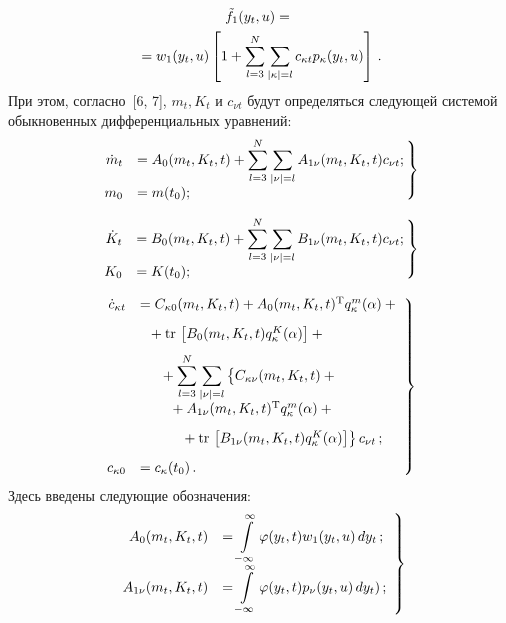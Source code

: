 \begin{multicols}{2}
\noindent
\begin{multline}
\tilde f_1 (y_t, u) ={}\\
{}= w_1 (y_t,u) \left[ 1+ \sum\limits_{l=3}^N \sum\limits_{\left\vert\kappa\right\vert=l} 
c_{\kappa t} p_\kappa (y_t,u)\right]\,.\label{e13s}
\end{multline}
При этом, согласно~[6, 7], $m_t, K_t$ и $c_{\nu t}$ будут определяться 
следующей системой обыкновенных дифференциальных уравнений:
\begin{equation}
\left.
\begin{array}{rl}
\!\!\!\!\!\dot m_t &= \displaystyle
A_0 (m_t, K_t, t) + \sss_{l=3}^N \sss_{\left\vert\nu\right\vert=l} 
A_{1\nu}(m_t, K_t, t)  c_{\nu t};\\[9pt] 
\!\!\!\!\!m_0 &= m(t_0);
\end{array}\!\!
\right\}\!\!\!\label{e14s}
\end{equation}

\noindent
\begin{equation}
\left.
\begin{array}{rl}
\!\!\!\!\!\dot K_t &= B_0 (m_t, K_t, t) +\displaystyle \sss_{l=3}^N \sss_{\left\vert\nu\right\vert=l} 
B_{1\nu}(m_t, K_t, t)  c_{\nu t};\\[9pt]
\!\!\!\!\!K_0 &= K(t_0);
\end{array}\!\!
\right\}\!\!\!
\label{e15s}
\end{equation}

\noindent
\begin{equation}
\left.
\begin{array}{rl}
\!\!\!\!\dot c_{\kappa t} &= C_{\kappa 0}  (m_t, K_t, t)+ A_0 (m_t, K_t, t)^{\mathrm{T}} 
q_\kappa^m (\alpha ) +{}\\[9pt]
&\hspace*{2mm}{}+
\mathrm{tr}\, \lk B_0 (m_t, K_t, t) q_\kappa^K (\alpha)\rk+{}\\[8pt]
&\hspace*{5mm}{}+ \displaystyle \sss_{l=3}^N \sss_{\left\vert\nu\right\vert=l} 
\left\{ \vphantom{B_{1v}k_\kappa^K}
C_{\kappa\nu} (m_t, K_t, t)+{}\right.\\[9pt]
&\hspace*{7mm}\left.{}+A_{1\nu}(m_t, K_t, t)^{\mathrm{T}} q_\kappa^m (\alpha) + {}\right.\\[9pt]
&\hspace*{10mm}\left.{}+
\mathrm{tr}\, \lk B_{1\nu} (m_t, K_t, t)q_\kappa^K(\alpha)\rk\right\} c_{\nu t}\,;\\[9pt]
\!\!\!\!c_{\kappa 0}&= c_\kappa(t_0)\,.
\end{array}\!
\right\}\!\!
\label{e16s}
\end{equation}
Здесь введены следующие обозначения:
    \begin{equation}
    \left.
    \begin{array}{rl}
    A_0 (m_t, K_t, t)&= \displaystyle\int\limits_{-\infty}^\infty \varphi(y_t, t) w_1 (y_t,u)\, dy_t\,;\\[9pt]
 A_{1\nu} (m_t, K_t, t) &=\displaystyle\int\limits_{-\infty}^\infty \varphi (y_t, t) p_\nu (y_t,u)\, d y_t)\,;
 \end{array}
 \right\}
 \label{e16-1s}
 \end{equation}


\end{multicols}
